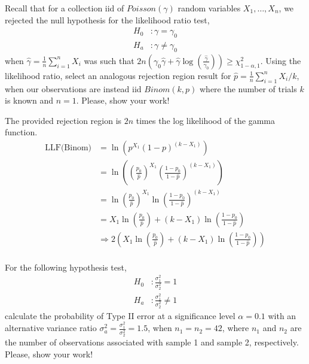 \documentclass[answers]{exam}
\begin{document}
\begin{questions}
\question 
Recall that for a collection iid of \(Poisson(\gamma)\) random variables
\(X_1,\ldots,X_n\), we rejected the null hypothesis for the likelihood ratio test,
\begin{align*}
	H_0 &: \gamma = \gamma_0 \\
	H_a &: \gamma \neq \gamma_0
\end{align*}
when \(\hat{\gamma}=\frac{1}{n}\sum_{i=1}^{n}X_i\) was such that \(2n(\gamma_0\hat{\gamma}+\hat{\gamma}\log(\frac{\hat{\gamma}}{\gamma_0}))\geq\chi^2_{1-\alpha,1}\).
Using the likelihood ratio, select an analogous rejection region result for 
\(\hat{p}=\frac{1}{n}\sum_{i=1}^{n}X_i/k\), when our observations are instead iid
\(Binom(k,p)\) where the number of trials \(k\) is known and \(n=1\). Please, show your work!
\begin{solution}
	The provided rejection region is \(2n\) times the log likelihood of the gamma function.
	\begin{align*}
		\text{LLF(Binom)}
		&= \ln\left(p^{X_1}(1-p)^{(k-X_1)}\right) \\
		&= \ln\left( \left(\frac{p_0}{\hat{p}}\right)^{X_1} \left(\frac{1-p_0}{1-\hat{p}}\right)^{(k-X_1)}\right) \\
		&= \ln\left(\frac{p_0}{\hat{p}}\right)^{X_1} \ln\left(\frac{1-p_0}{1-\hat{p}}\right)^{(k-X_1)} \\
		&= X_1\ln\left(\frac{p_0}{\hat{p}}\right) + (k-X_1)\ln\left(\frac{1-p_0}{1-\hat{p}}\right) \\
		&\Rightarrow 2\left(X_1\ln\left(\frac{p_0}{\hat{p}}\right) + (k-X_1)\ln\left(\frac{1-p_0}{1-\hat{p}}\right)\right) \\
	\end{align*}
	
\end{solution}

\question 
For the following hypothesis test,
\begin{align*}
	H_0 &: \frac{\sigma_1^2}{\sigma_2^2} = 1 \\
	H_a &: \frac{\sigma_1^2}{\sigma_2^2} \neq 1 
\end{align*}
calculate the probability of Type II error at a significance level \(\alpha=0.1\) 
with an alternative variance ratio \(\sigma_a^2=\frac{\sigma_1^2}{\sigma_2^2}=1.5\),
when \(n_1=n_2=42\), where \(n_1\) and \(n_2\) are the number of observations associated 
with sample 1 and sample 2, respectively. Please, show your work!


\end{questions}
\end{document}

